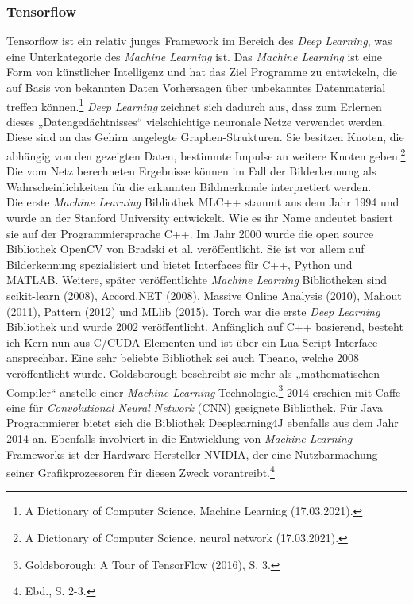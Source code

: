 \documentclass[a4paper,12pt,ngerman]{article}
\begin{document}
\subsubsection{Tensorflow}
Tensorflow ist ein relativ junges Framework im Bereich des \textit{Deep Learning}, was eine Unterkategorie des \textit{Machine Learning} ist. Das \textit{Machine Learning} ist eine Form von künstlicher Intelligenz und hat das Ziel Programme zu entwickeln, die auf Basis von bekannten Daten Vorhersagen über unbekanntes Datenmaterial treffen können.\footnote{A Dictionary of Computer Science, Machine Learning (17.03.2021).}  \textit{Deep Learning} zeichnet sich dadurch aus, dass zum Erlernen dieses „Datengedächtnisses“ vielschichtige neuronale Netze verwendet werden. Diese sind an das Gehirn angelegte Graphen-Strukturen. Sie besitzen Knoten, die abhängig von den gezeigten Daten, bestimmte Impulse an weitere Knoten geben.\footnote{A Dictionary of Computer Science, neural network (17.03.2021).} Die vom Netz berechneten Ergebnisse können im Fall der Bilderkennung als Wahrscheinlichkeiten für die erkannten Bildmerkmale interpretiert werden. \\
Die erste \textit{Machine Learning} Bibliothek MLC++ stammt aus dem Jahr 1994 und wurde an der Stanford University entwickelt. Wie es ihr Name andeutet basiert sie auf der Programmiersprache C++. Im Jahr 2000 wurde die open source Bibliothek OpenCV von Bradski et al. veröffentlicht. Sie ist vor allem auf Bilderkennung spezialisiert und bietet Interfaces für C++, Python und MATLAB. Weitere, später veröffentlichte \textit{Machine Learning} Bibliotheken sind scikit-learn (2008), Accord.NET (2008), Massive Online Analysis (2010), Mahout (2011), Pattern (2012) und MLlib (2015). Torch war die erste \textit{Deep Learning} Bibliothek und wurde 2002 veröffentlicht. Anfänglich auf C++ basierend, besteht ich Kern nun aus C/CUDA Elementen und ist über ein Lua-Script Interface ansprechbar. Eine sehr beliebte Bibliothek sei auch Theano, welche 2008 veröffentlicht wurde. Goldsborough beschreibt sie mehr als „mathematischen Compiler“ anstelle einer \textit{Machine Learning} Technologie.\footnote{Goldsborough: A Tour of TensorFlow (2016), S. 3.}  2014 erschien mit Caffe eine für \textit{Convolutional Neural Network} (CNN) geeignete Bibliothek. Für Java Programmierer bietet sich die Bibliothek Deeplearning4J ebenfalls aus dem Jahr 2014 an. Ebenfalls involviert in die Entwicklung von \textit{Machine Learning} Frameworks ist der Hardware Hersteller NVIDIA, der eine Nutzbarmachung seiner Grafikprozessoren für diesen Zweck vorantreibt.\footnote{Ebd., S. 2-3.} \\
\end{document}
